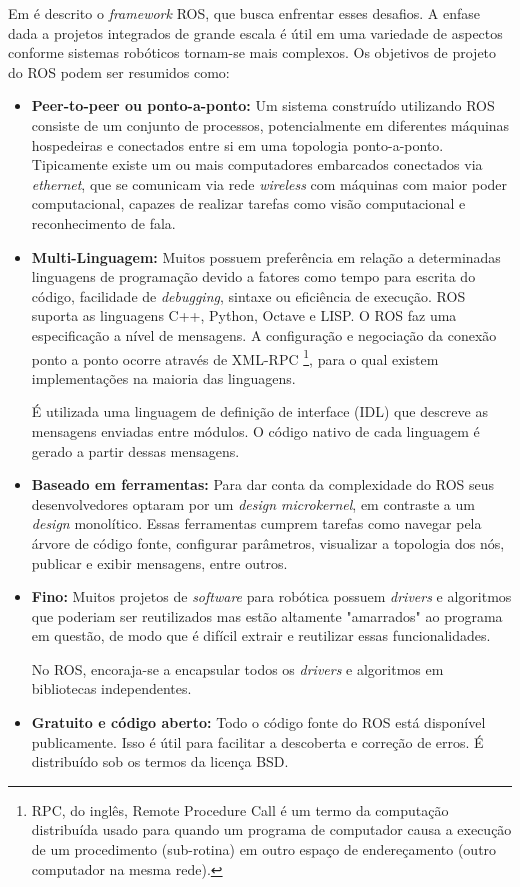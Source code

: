 Em \citep{quigley2009ros} é descrito o \textit{framework} ROS, que busca enfrentar esses desafios. A enfase dada a projetos integrados de grande escala é útil em uma variedade de aspectos conforme sistemas robóticos tornam-se mais complexos. Os objetivos de projeto do ROS podem ser resumidos como: 
\begin{itemize}
\item \textbf{Peer-to-peer ou ponto-a-ponto:} Um sistema construído utilizando ROS consiste de um conjunto de processos, potencialmente em diferentes máquinas hospedeiras e conectados entre si em uma topologia ponto-a-ponto. Tipicamente existe um ou mais computadores embarcados conectados via \textit{ethernet}, que se comunicam via rede \textit{wireless} com máquinas com maior poder computacional, capazes de realizar tarefas como visão computacional e reconhecimento de fala. 

\item \textbf{Multi-Linguagem:} Muitos possuem preferência em relação a determinadas linguagens de programação devido a fatores como tempo para escrita do código, facilidade de \textit{debugging}, sintaxe ou eficiência de execução. ROS suporta as linguagens C++, Python, Octave e LISP. O ROS faz uma especificação a nível de mensagens. A configuração e negociação da conexão ponto a ponto ocorre através de XML-RPC \footnote{RPC, do inglês, Remote Procedure Call é um termo da computação distribuída usado para quando um programa de computador causa a execução de um procedimento (sub-rotina) em outro espaço de endereçamento (outro computador na mesma rede).}, para o qual existem implementações na maioria das linguagens.   

É utilizada uma linguagem de definição de interface (IDL) que descreve as mensagens enviadas entre módulos. O código nativo de cada linguagem é gerado a partir dessas mensagens. 


\item \textbf{Baseado em ferramentas:} Para dar conta da complexidade do ROS seus desenvolvedores optaram por um  \textit{design microkernel}, em contraste a um \textit{design} monolítico. Essas ferramentas cumprem tarefas como navegar pela árvore de código fonte, configurar parâmetros, visualizar a topologia dos nós, publicar e exibir mensagens, entre outros.

\item \textbf{Fino:} Muitos projetos de \textit{software} para robótica possuem \textit{drivers} e algoritmos que poderiam ser reutilizados mas estão altamente "amarrados" ao programa em questão, de modo que é difícil extrair e reutilizar essas funcionalidades.

No ROS, encoraja-se a encapsular todos os \textit{drivers} e algoritmos em bibliotecas independentes. 


\item \textbf{Gratuito e código aberto:} Todo o código fonte do ROS está disponível publicamente. Isso é útil para facilitar a descoberta e correção de erros. É distribuído sob os termos da licença BSD.  

\end{itemize}

